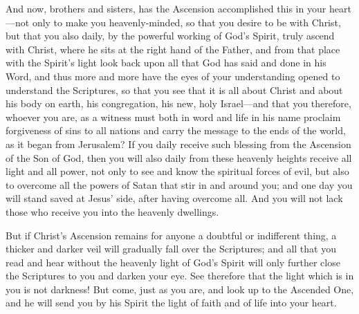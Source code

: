 And now, brothers and sisters, has the Ascension accomplished this in your heart—not only to make you heavenly‑minded, so that you desire to be with Christ, but that you also daily, by the powerful working of God’s Spirit, truly ascend with Christ, where he sits at the right hand of the Father, and from that place with the Spirit’s light look back upon all that God has said and done in his Word, and thus more and more have the eyes of your understanding opened to understand the Scriptures, so that you see that it is all about Christ and about his body on earth, his congregation, his new, holy Israel—and that you therefore, whoever you are, as a witness must both in word and life in his name proclaim forgiveness of sins to all nations and carry the message to the ends of the world, as it began from Jerusalem? If you daily receive such blessing from the Ascension of the Son of God, then you will also daily from these heavenly heights receive all light and all power, not only to see and know the spiritual forces of evil, but also to overcome all the powers of Satan that stir in and around you; and one day you will stand saved at Jesus’ side, after having overcome all. And you will not lack those who receive you into the heavenly dwellings.

But if Christ’s Ascension remains for anyone a doubtful or indifferent thing, a thicker and darker veil will gradually fall over the Scriptures; and all that you read and hear without the heavenly light of God’s Spirit will only further close the Scriptures to you and darken your eye. See therefore that the light which is in you is not darkness! But come, just as you are, and look up to the Ascended One, and he will send you by his Spirit the light of faith and of life into your heart.

